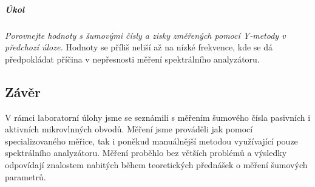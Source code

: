 \documentclass[11pt,a4paper]{article}
\begin{document}
\subparagraph*{Úkol} \emph{Porovnejte hodnoty s šumovými čísly a zisky změřených pomocí Y-metody v předchozí úloze.} Hodnoty se příliš neliší až na nízké frekvence, kde se dá předpokládat příčina v nepřesnosti měření spektrálního analyzátoru.

\subsection*{Závěr}
V rámci laboratorní úlohy jsme se seznámili s měřením šumového čísla pasivních i aktivních mikrovlnných obvodů. Měření jsme prováděli jak pomocí specializovaného měřice, tak i poněkud manuálnější metodou využívající pouze spektrálního analyzátoru. Měření proběhlo bez větších problémů a výsledky odpovídají znalostem nabitých během teoretických přednášek o měření šumových parametrů.
\end{document}
